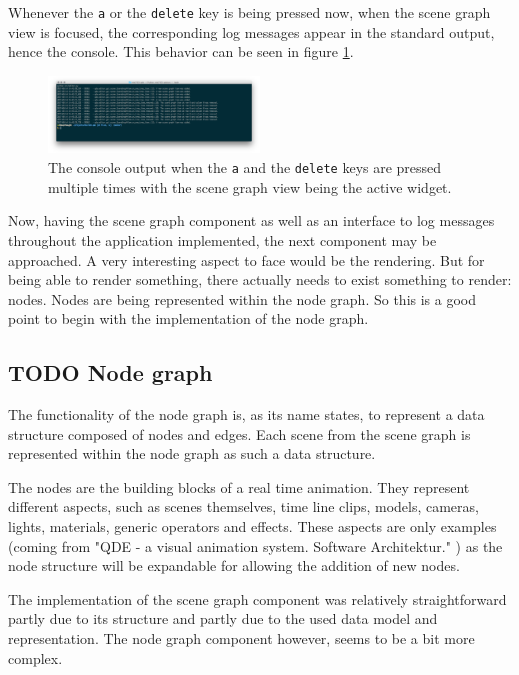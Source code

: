 \documentclass[10pt, openright, notitlepage]{scrreprt}
\begin{document}
Whenever the \texttt{a} or the \texttt{delete} key is being pressed now, when the scene graph
view is focused, the corresponding log messages appear in the standard output,
hence the console. This behavior can be seen in figure \ref{fig:editor-alpha-04}.

\begin{figure}[H]
\centering
\includegraphics[width=0.5\textwidth]{./images/qde_alpha_04.png}
\caption{\label{fig:editor-alpha-04}
The console output when the \texttt{a} and the \texttt{delete} keys are pressed multiple times with the scene graph view being the active widget.}
\end{figure}

Now, having the scene graph component as well as an interface to log messages
throughout the application implemented, the next component may be approached. A
very interesting aspect to face would be the rendering. But for being able to
render something, there actually needs to exist something to render: nodes.
Nodes are being represented within the node graph. So this is a good point to
begin with the implementation of the node graph.
\subsection{{\bfseries\sffamily TODO} Node graph}
\label{sec:orgeefd185}
The functionality of the node graph is, as its name states, to represent a data
structure composed of nodes and edges. Each scene from the scene graph is
represented within the node graph as such a data structure.

The nodes are the building blocks of a real time animation. They represent
different aspects, such as scenes themselves, time line clips, models, cameras,
lights, materials, generic operators and effects. These aspects are only examples
(coming from "QDE - a visual animation system. Software Architektur."
\cite[p. 30 and 31]{osterwalder_qde_2016}) as the node structure will be
expandable for allowing the addition of new nodes.

The implementation of the scene graph component was relatively straightforward
partly due to its structure and partly due to the used data model and
representation. The node graph component however, seems to be a bit more complex.
\end{document}

